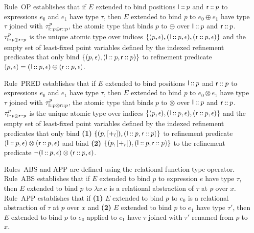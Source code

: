 Rule~OP establishes that if $E$ extended to bind positions
$\mathsf{l} \mathbin{::} p$ and $\mathsf{r} \mathbin{::} p$ to expressions $e_0$
and $e_1$ have type $\tau$, then $E$ extended to bind $p$ to
$e_0 \oplus e_1$ have type $\tau$ joined with
$\tau_{\mathsf{l} \mathbin{::} p \oplus \mathsf{r} \mathbin{::} p}^p$, the atomic
type that binds $p$ to $\oplus$ over $\mathsf{l} \mathbin{::} p$ and
$\mathsf{r} \mathbin{::} p$.
%
$\tau_{\mathsf{l} \mathbin{::} p \oplus \mathsf{r} \mathbin{::} p}^p$ is the unique
atomic type over indices
$\{  (p, \epsilon), (\mathsf{l} \mathbin{::} p, \epsilon), (\mathsf{r}
  \mathbin{::} p, \epsilon)  \}$ and the empty set of least-fixed point
variables defined by the indexed refinement predicates that only bind
$\{  (p, \epsilon), (\mathsf{l} \mathbin{::} p, \mathsf{r} \mathbin{::} p)  \}$ to
refinement predicate
$(p, \epsilon) = (\mathsf{l} \mathbin{::} p, \epsilon) \oplus (\mathsf{r}
\mathbin{::} p, \epsilon)$.

Rule~PRED establishes that if $E$ extended to bind positions
$\mathsf{l} \mathbin{::} p$ and $\mathsf{r} \mathbin{::} p$ to expressions $e_0$
and $e_1$ have type $\tau$, then $E$ extended to bind $p$ to
$e_0 \otimes e_1$ have type $\tau$ joined with
$\tau_{\mathsf{l} \mathbin{::} p \otimes \mathsf{r} \mathbin{::} p}^p$, the atomic
type that binds $p$ to $\otimes$ over $\mathsf{l} \mathbin{::} p$ and
$\mathsf{r} \mathbin{::} p$.
%
$\tau_{\mathsf{l} \mathbin{::} p \otimes \mathsf{r} \mathbin{::} p}^p$ is the
unique atomic type over indices
$\{  (p, \epsilon), (\mathsf{l} \mathbin{::} p, \epsilon), (\mathsf{r}
  \mathbin{::} p, \epsilon)  \}$ and the empty set of least-fixed point
variables defined by the indexed refinement predicates that only bind
\textbf{(1)}
$\{  (p, [ +_l ]), (\mathsf{l} \mathbin{::} p, \mathsf{r} \mathbin{::} p)
 \}$ to refinement predicate
$(\mathsf{l} \mathbin{::} p, \epsilon) \otimes (\mathsf{r} \mathbin{::} p,
\epsilon)$ and bind \textbf{(2)}
$\{  (p, [ +_r ]), (\mathsf{l} \mathbin{::} p, \mathsf{r} \mathbin{::}
  p)  \}$ to the refinement predicate
$\lnot (\mathsf{l} \mathbin{::} p, \epsilon) \otimes (\mathsf{r} \mathbin{::} p,
\epsilon)$.

Rules~ABS and APP are defined using the relational function type
operator.
%
Rule~ABS establishes that if $E$ extended to bind $p$ to expression
$e$ have type $\tau$, then $E$ extended to bind $p$ to $\lambda x. e$
is a relational abstraction of $\tau$ at $p$ over $x$.
Rule~APP establishes that if %
\textbf{(1)} $E$ extended to bind $p$ to $e_0$ is a relational
abstraction of $\tau$ at $p$ over $x$ and %
\textbf{(2)} $E$ extended to bind $p$ to $e_1$ have type $\tau'$, then
$E$ extended to bind $p$ to $e_0$ applied to $e_1$ have $\tau$ joined
with $\tau'$ renamed from $p$ to $x$.


